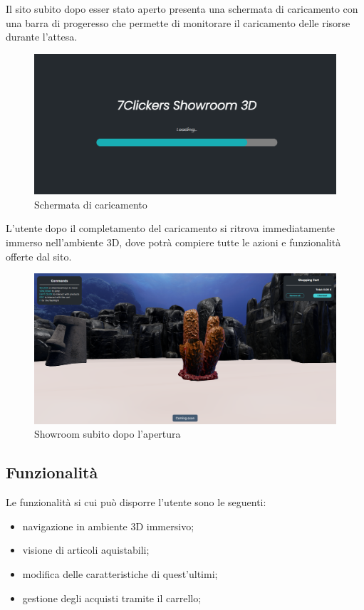 Il sito subito dopo esser stato aperto presenta una schermata di caricamento con una barra di progeresso che permette di monitorare il caricamento delle risorse durante l'attesa.
\begin{figure}[H]
  \renewcommand{\thefigure}{1}
  \includegraphics[width=\linewidth]{./res/images/loading_screen.png}
  \caption{Schermata di caricamento}
  \label{Schermata di caricamento}
\end{figure}
L'utente dopo il completamento del caricamento si ritrova immediatamente immerso nell'ambiente 3D, dove potrà compiere tutte le azioni e funzionalità offerte dal sito. 
\begin{figure}[H]
  \renewcommand{\thefigure}{2}
  \includegraphics[width=\linewidth]{./res/images/schermata_iniziale.png}
  \caption{Showroom subito dopo l'apertura}
  \label{Showroom subito dopo l'apertura}
\end{figure}

\pagebreak

\subsection{Funzionalità}
Le funzionalità si cui può disporre l'utente sono le seguenti:
\begin{itemize}
\item navigazione in ambiente 3D immersivo;
\item visione di articoli aquistabili;
\item modifica delle caratteristiche di quest'ultimi;
\item gestione degli acquisti tramite il carrello;
\end{itemize}

